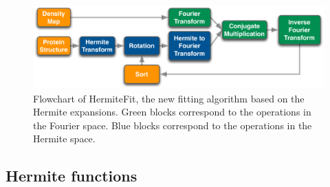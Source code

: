 \begin{figure}[H]
\label{fig:FourierFitting}
\includegraphics[width=1\textwidth]{Hermite/Fig/figure2}
\caption[Flowchart of HermiteFit]{Flowchart of HermiteFit, the new fitting algorithm based on the Hermite expansions.
Green blocks correspond to the operations in the Fourier space. Blue
blocks correspond to the operations in the Hermite space.}
\end{figure}

\begin{table}
\medskip
\caption[Complexity of the Hermite fitting algorithm]{ Complexity of the Hermite fitting algorithm. Here, $M$ denotes
the order of the Fourier decomposition; 
$N$ is the order
of the Hermite decomposition; $N_{atoms}$ is the number of atoms in the
protein; $N_{rot}$ -- the number of rotations to be sampled.}
\label{table:FourierFitComp}
\end{table}

\subsection{Hermite functions}


